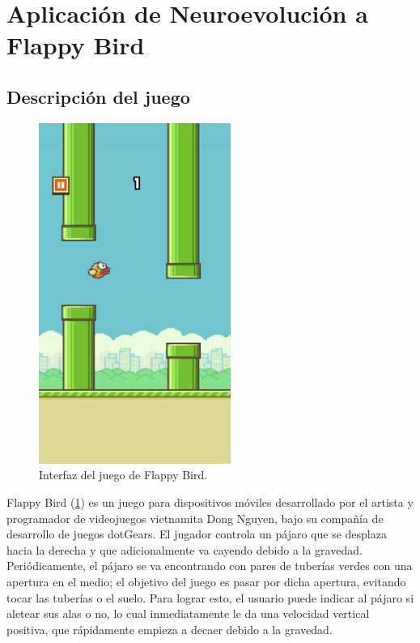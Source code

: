 \documentclass[twocolumn,spanish]{revtex4-1}
\begin{document}
\section{Aplicación de Neuroevolución a Flappy Bird}

\subsection{Descripción del juego}
\begin{figure}[ht]
    \centering
    \includegraphics[width=0.55\linewidth]{images/Flappy_Bird_gameplay.png}
    \caption{Interfaz del juego de Flappy Bird.}
    \label{fig:gameplay}
\end{figure}

Flappy Bird (\cref{fig:gameplay}) es un juego para dispositivos móviles desarrollado por el artista y programador de videojuegos vietnamita Dong Nguyen, bajo su compañía de desarrollo de juegos dotGears. El jugador controla un pájaro que se desplaza hacia la derecha y que adicionalmente va cayendo debido a la gravedad. Periódicamente, el pájaro se va encontrando con pares de tuberías verdes con una apertura en el medio; el objetivo del juego es pasar por dicha apertura, evitando tocar las tuberías o el suelo. Para lograr esto, el usuario puede indicar al pájaro si aletear sus alas o no, lo cual inmediatamente le da una velocidad vertical positiva, que rápidamente empieza a decaer debido a la gravedad.
\end{document}
